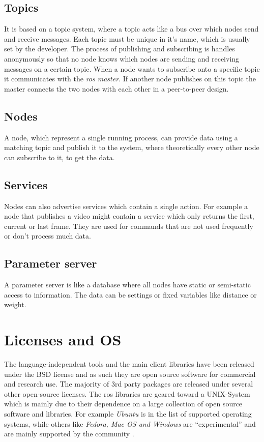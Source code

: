 \subsection{Topics}
It is based on a topic system, where a topic acts like a bus over which nodes send and receive messages. Each topic must be unique in it's name, which is usually set by the developer. The process of publishing and subscribing is handles anonymously so that no node knows which nodes are sending and receiving messages on a certain topic. When a node wants to subscribe onto a specific topic it communicates with the \textit{\gls{ros} master}. If another node publishes on this topic the master connects the two nodes with each other in a peer-to-peer design.

\subsection{Nodes}
A node, which represent a single running process, can provide data using a matching topic and publish it to the system, where theoretically every other node can subscribe to it, to get the data. 

\subsection{Services} \label{ref:rosservice}
Nodes can also advertise services which contain a single action. For example a node that publishes a video might contain a service which only returns the first, current or last frame. They are used for commands that are not used frequently or don't process much data.

\subsection{Parameter server}
A parameter server is like a database where all nodes have static or semi-static access to information. The data can be settings or fixed variables like distance or weight.

\section{Licenses and OS}
The language-independent tools and the main client libraries have been released under the BSD license and as such they are open source software for commercial and research use. The majority of 3rd party packages are released under several other open-source licenses.\newline
The \gls{ros} libraries are geared toward a UNIX-System which is mainly due to their dependence on a large collection of open source software and libraries.
For example \textit{Ubuntu} is in the list of supported operating systems, while others like \textit{Fedora, Mac OS and Windows} are \enquote{experimental} and are mainly supported by the community \cite{isrosforme}.

